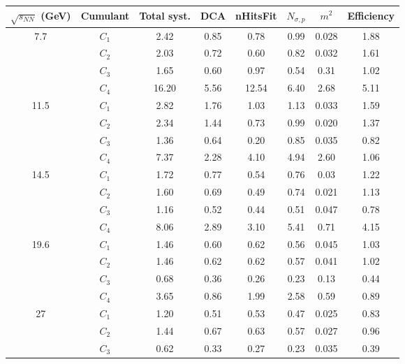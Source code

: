 \documentclass[11pt]{article}
\begin{document}
\begin{table}[]
\begin{tabular}{@{}cccccccc@{}}
\toprule
$\sqrt{s_{NN}}$ (GeV) & Cumulant & Total syst. & DCA & nHitsFit & $N_{\sigma, p}$ & $m^2$ & Efficiency \\ \midrule
\multirow{4}{*}{7.7}  & $C_1$ & 2.42  & 0.85 & 0.78  & 0.99 & 0.028 & 1.88  \\
                      & $C_2$ & 2.03  & 0.72 & 0.60  & 0.82 & 0.032 & 1.61  \\
                      & $C_3$ & 1.65  & 0.60 & 0.97  & 0.54 & 0.31  & 1.02  \\
                      & $C_4$ & 16.20 & 5.56 & 12.54 & 6.40 & 2.68  & 5.11  \\ \midrule
\multirow{4}{*}{11.5} & $C_1$ & 2.82  & 1.76 & 1.03  & 1.13 & 0.033 & 1.59  \\
                      & $C_2$ & 2.34  & 1.44 & 0.73  & 0.99 & 0.020 & 1.37  \\
                      & $C_3$ & 1.36  & 0.64 & 0.20  & 0.85 & 0.035 & 0.82  \\
                      & $C_4$ & 7.37  & 2.28 & 4.10  & 4.94 & 2.60  & 1.06  \\ \midrule
\multirow{4}{*}{14.5} & $C_1$ & 1.72  & 0.77 & 0.54  & 0.76 & 0.03  & 1.22  \\
                      & $C_2$ & 1.60  & 0.69 & 0.49  & 0.74 & 0.021 & 1.13  \\
                      & $C_3$ & 1.16  & 0.52 & 0.44  & 0.51 & 0.047 & 0.78  \\
                      & $C_4$ & 8.06  & 2.89 & 3.10  & 5.41 & 0.71  & 4.15  \\ \midrule
\multirow{4}{*}{19.6} & $C_1$ & 1.46  & 0.60 & 0.62  & 0.56 & 0.045 & 1.03  \\
                      & $C_2$ & 1.46  & 0.62 & 0.62  & 0.57 & 0.041 & 1.02  \\
                      & $C_3$ & 0.68  & 0.36 & 0.26  & 0.23 & 0.13  & 0.44  \\
                      & $C_4$ & 3.65  & 0.86 & 1.99  & 2.58 & 0.59  & 0.89  \\ \midrule
\multirow{4}{*}{27}   & $C_1$ & 1.20  & 0.51 & 0.53  & 0.47 & 0.025 & 0.83  \\
                      & $C_2$ & 1.44  & 0.67 & 0.63  & 0.57 & 0.027 & 0.96  \\
                      & $C_3$ & 0.62  & 0.33 & 0.27  & 0.23 & 0.035 & 0.39  \\

\end{tabular}
\end{table}
\end{document}
